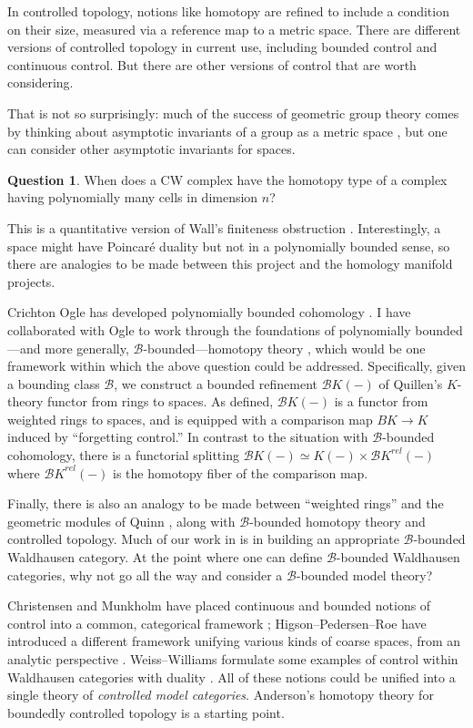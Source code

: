 \documentclass[12pt]{amsart}
\theoremstyle{definition}
\newtheorem{question}[theorem]{Question}
\newcommand{\B}{\mathcal{B}}
\begin{document}
In controlled topology, notions like homotopy are refined to include a
condition on their size, measured via a reference map to a metric
space.  There are different versions of controlled topology in current
use, including bounded control and continuous control. But there are
other versions of control that are worth considering.

That is not so surprisingly: much of the success of geometric group
theory comes by thinking about asymptotic invariants of a group as a
metric space \cite{MR1253544}, but one can consider other asymptotic
invariants for spaces.
\begin{question}
When does a CW complex have the homotopy type of a complex having polynomially many cells in
dimension $n$?
\end{question}
This is a quantitative version of Wall's finiteness obstruction
\cite{MR171284}.  Interestingly, a space might have Poincar\'e duality but
not in a polynomially bounded sense, so there are analogies to be made
between this project and the homology manifold projects.

Crichton Ogle has developed polynomially bounded cohomology
\cite{MR2109110}.  I have collaborated with Ogle to work through the
foundations of polynomially bounded---and more generally,
$\B$-bounded---homotopy theory \cite{MR2962981}, which would be one
framework within which the above question could be addressed.
Specifically, given a bounding class $\B$, we construct a bounded
refinement ${\B K}(-)$ of Quillen's $K$-theory functor from rings to
spaces. As defined, ${\B K}(-)$ is a functor from weighted rings to
spaces, and is equipped with a comparison map $BK \to K$ induced by
``forgetting control.''  In contrast to the situation with
$\B$-bounded cohomology, there is a functorial splitting ${\B K}(-)
\simeq K(-) \times {\B K}^{rel}(-)$ where ${\B K}^{rel}(-)$ is the
homotopy fiber of the comparison map.

Finally, there is also an analogy to be made between ``weighted
rings'' and the geometric modules of Quinn \cite{MR802791}, along with
$\B$-bounded homotopy theory and controlled topology.  Much of our
work in \cite{MR2962981} is in building an appropriate $\B$-bounded
Waldhausen category.  At the point where one can define $\B$-bounded
Waldhausen categories, why not go all the way and consider a
$\B$-bounded model theory?

Christensen and Munkholm have placed continuous and bounded notions of
control into a common, categorical framework \cite{MR1983017};
Higson--Pedersen--Roe have introduced a different framework unifying
various kinds of coarse spaces, from an analytic perspective
\cite{MR1451755}.  Weiss--Williams formulate some examples of control
within Waldhausen categories with duality \cite{MR1644309}.  All of
these notions could be unified into a single theory of
\textit{controlled model categories}.  Anderson's homotopy theory for
boundedly controlled topology \cite{MR953961} is a starting point.
\end{document}
